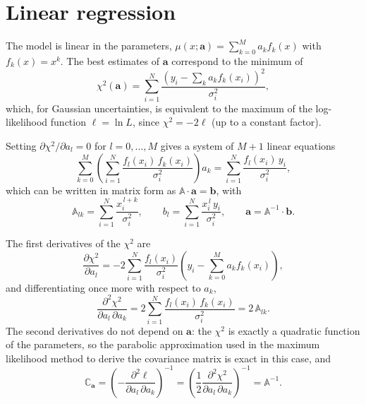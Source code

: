 \documentclass[11pt,a4paper]{article}
\begin{document}
	\section*{Linear regression}

	The model is linear in the parameters, $\mu(x; \mathbf{a}) = \sum_{k=0}^{M} a_k f_k(x)$ with $f_k(x) = x^k$.
	The best estimates of $\mathbf{a}$ correspond to the minimum of
	\begin{equation}
		\chi^2(\mathbf{a}) = \sum_{i=1}^{N} \frac{\left(y_i - \sum_{k} a_k f_k(x_i)\right)^2}{\sigma_i^2} ,
	\end{equation}
	which, for Gaussian uncertainties, is equivalent to the maximum of the log-likelihood function $\ell = \ln L$, since $\chi^2 = -2\ell$ (up to a constant factor).

	Setting $\partial\chi^2/\partial a_l = 0$ for $l = 0, \dots, M$ gives a system of $M+1$ linear equations
	\begin{equation}
		\sum_{k=0}^{M} \left( \sum_{i=1}^{N} \frac{f_l(x_i)\, f_k(x_i)}{\sigma_i^2} \right) a_k = \sum_{i=1}^{N} \frac{f_l(x_i)\, y_i}{\sigma_i^2} ,
	\end{equation}
	which can be written in matrix form as $\mathbb{A}\cdot\mathbf{a} = \mathbf{b}$, with
	\begin{equation}
		\mathbb{A}_{lk} = \sum_{i=1}^{N} \frac{x_i^{\,l+k}}{\sigma_i^2} ,
		\qquad
		b_l = \sum_{i=1}^{N} \frac{x_i^{\,l}\, y_i}{\sigma_i^2} ,
		\qquad
		\mathbf{a} = \mathbb{A}^{-1} \cdot \mathbf{b} .
	\end{equation}

	The first derivatives of the $\chi^2$ are
	\begin{equation}
		\frac{\partial\chi^2}{\partial a_l} = -2 \sum_{i=1}^{N} \frac{f_l(x_i)}{\sigma_i^2} \left( y_i - \sum_{k=0}^{M} a_k f_k(x_i) \right) ,
	\end{equation}
	and differentiating once more with respect to $a_k$,
	\begin{equation}
		\frac{\partial^2\chi^2}{\partial a_l\, \partial a_k} = 2 \sum_{i=1}^{N} \frac{f_l(x_i)\, f_k(x_i)}{\sigma_i^2} = 2\,\mathbb{A}_{lk} .
	\end{equation}
	The second derivatives do not depend on $\mathbf{a}$: the $\chi^2$ is exactly a quadratic function of the parameters, so the parabolic approximation used in the maximum likelihood method to derive the covariance matrix is exact in this case, and
	\begin{equation}
		\mathbb{C}_{\mathbf{a}} = \left(-\frac{\partial^2 \ell}{\partial a_l\, \partial a_k}\right)^{-1} = \left(\frac{1}{2}\frac{\partial^2\chi^2}{\partial a_l\, \partial a_k}\right)^{-1} = \mathbb{A}^{-1} .
	\end{equation}
\end{document}
